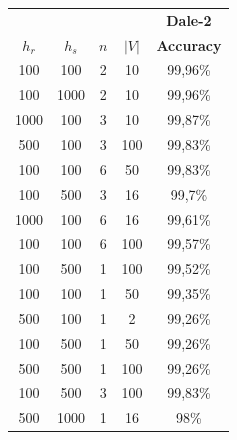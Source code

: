 \begin{table}[ht]
    \centering
    \begin{tabular}{cccc|c}
        \toprule
                                      &           &     &       & \multicolumn{1}{c}{\textbf{Dale-2}} \\  \cmidrule(lr){5-5}
        $h_r$                         & $h_s$     & $n$ & $|V|$ & \textbf{Accuracy}                   \\\midrule
        {100}                         & {100}     & {2} & {10}  & {99,96\%}                           \\
        {100}                         & {1000}    & {2} & {10}  & {99,96\%}                           \\
        {1000}                        & {100}     & {3} & {10}  & {99,87\%}                           \\
        {500}                         & {100}     & {3} & {100} & {99,83\%}                           \\
        {100}                         & {100}     & {6} & {50}  & {99,83\%}                           \\
        {100}                         & {500}     & {3} & {16}  & {99,7\%}                            \\
        {1000}                        & {100}     & {6} & {16}  & {99,61\%}                           \\
        {100}                         & {100}     & {6} & {100} & {99,57\%}                           \\
        {100}                         & {500}     & {1} & {100} & {99,52\%}                           \\
        {100}                         & {100}     & {1} & {50}  & {99,35\%}                           \\
        {500}                         & {100}     & {1} & {2}   & {99,26\%}                           \\
        {100}                         & {500}     & {1} & {50}  & {99,26\%}                           \\
        {500}                         & {500}     & {1} & {100} & {99,26\%}                           \\
        {100}                         & {500}     & {3} & {100} & {99,83\%}                           \\
        {500}                         & {1000}    & {1} & {16}  & {98\%}                              \\

\end{tabular}
\end{table}
